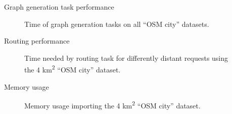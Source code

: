 \documentclass[xcolor={x11names}]{beamer}
\newenvironment{figcenter}
{%
	\parskip=0pt%
	\par%
	\nopagebreak%
	\centering%
}%
{%
	\par%
	\noindent%
	\ignorespacesafterend%
}
\begin{document}
		\begin{frame}{Graph generation task performance}
			\begin{figure}
				\begin{figcenter}
					\hspace*{-0.35cm}
					\scalebox{0.7}
					{
						
					}
				\end{figcenter}
				\caption{Time of graph generation tasks on all \enquote{OSM city} datasets.}
			\end{figure}
		\end{frame}
		
		\begin{frame}{Routing performance}
			\begin{figure}
				\begin{figcenter}
					\hspace*{-0.35cm}
					\scalebox{0.7}
					{
						
					}
				\end{figcenter}
				\caption{Time needed by routing task for differently distant requests using the 4 km\textsuperscript{2} \enquote{OSM city} dataset.}
			\end{figure}
		\end{frame}
		
		\begin{frame}{Memory usage}
			\begin{figure}
				\begin{figcenter}
					\hspace*{-0.35cm}
					\scalebox{0.7}
					{
						
					}
				\end{figcenter}
				\caption{Memory usage importing the 4 km\textsuperscript{2} \enquote{OSM city} dataset.}
			\end{figure}
		\end{frame}
		
\end{document}
